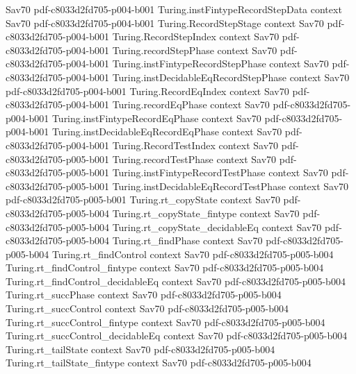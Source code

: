 \begin{theorem}
  {Sav70}
  {pdf-c8033d2fd705-p004-b001}
\proofstep
  {Turing.instFintypeRecordStepData}
  {context}
  {Sav70}
  {pdf-c8033d2fd705-p004-b001}
\proofstep
  {Turing.RecordStepStage}
  {context}
  {Sav70}
  {pdf-c8033d2fd705-p004-b001}
\proofstep
  {Turing.RecordStepIndex}
  {context}
  {Sav70}
  {pdf-c8033d2fd705-p004-b001}
\proofstep
  {Turing.recordStepPhase}
  {context}
  {Sav70}
  {pdf-c8033d2fd705-p004-b001}
\proofstep
  {Turing.instFintypeRecordStepPhase}
  {context}
  {Sav70}
  {pdf-c8033d2fd705-p004-b001}
\proofstep
  {Turing.instDecidableEqRecordStepPhase}
  {context}
  {Sav70}
  {pdf-c8033d2fd705-p004-b001}
\proofstep
  {Turing.RecordEqIndex}
  {context}
  {Sav70}
  {pdf-c8033d2fd705-p004-b001}
\proofstep
  {Turing.recordEqPhase}
  {context}
  {Sav70}
  {pdf-c8033d2fd705-p004-b001}
\proofstep
  {Turing.instFintypeRecordEqPhase}
  {context}
  {Sav70}
  {pdf-c8033d2fd705-p004-b001}
\proofstep
  {Turing.instDecidableEqRecordEqPhase}
  {context}
  {Sav70}
  {pdf-c8033d2fd705-p004-b001}
\proofstep
  {Turing.RecordTestIndex}
  {context}
  {Sav70}
  {pdf-c8033d2fd705-p005-b001}
\proofstep
  {Turing.recordTestPhase}
  {context}
  {Sav70}
  {pdf-c8033d2fd705-p005-b001}
\proofstep
  {Turing.instFintypeRecordTestPhase}
  {context}
  {Sav70}
  {pdf-c8033d2fd705-p005-b001}
\proofstep
  {Turing.instDecidableEqRecordTestPhase}
  {context}
  {Sav70}
  {pdf-c8033d2fd705-p005-b001}
\proofstep
  {Turing.rt_copyState}
  {context}
  {Sav70}
  {pdf-c8033d2fd705-p005-b004}
\proofstep
  {Turing.rt_copyState_fintype}
  {context}
  {Sav70}
  {pdf-c8033d2fd705-p005-b004}
\proofstep
  {Turing.rt_copyState_decidableEq}
  {context}
  {Sav70}
  {pdf-c8033d2fd705-p005-b004}
\proofstep
  {Turing.rt_findPhase}
  {context}
  {Sav70}
  {pdf-c8033d2fd705-p005-b004}
\proofstep
  {Turing.rt_findControl}
  {context}
  {Sav70}
  {pdf-c8033d2fd705-p005-b004}
\proofstep
  {Turing.rt_findControl_fintype}
  {context}
  {Sav70}
  {pdf-c8033d2fd705-p005-b004}
\proofstep
  {Turing.rt_findControl_decidableEq}
  {context}
  {Sav70}
  {pdf-c8033d2fd705-p005-b004}
\proofstep
  {Turing.rt_succPhase}
  {context}
  {Sav70}
  {pdf-c8033d2fd705-p005-b004}
\proofstep
  {Turing.rt_succControl}
  {context}
  {Sav70}
  {pdf-c8033d2fd705-p005-b004}
\proofstep
  {Turing.rt_succControl_fintype}
  {context}
  {Sav70}
  {pdf-c8033d2fd705-p005-b004}
\proofstep
  {Turing.rt_succControl_decidableEq}
  {context}
  {Sav70}
  {pdf-c8033d2fd705-p005-b004}
\proofstep
  {Turing.rt_tailState}
  {context}
  {Sav70}
  {pdf-c8033d2fd705-p005-b004}
\proofstep
  {Turing.rt_tailState_fintype}
  {context}
  {Sav70}
  {pdf-c8033d2fd705-p005-b004}

\end{theorem}
